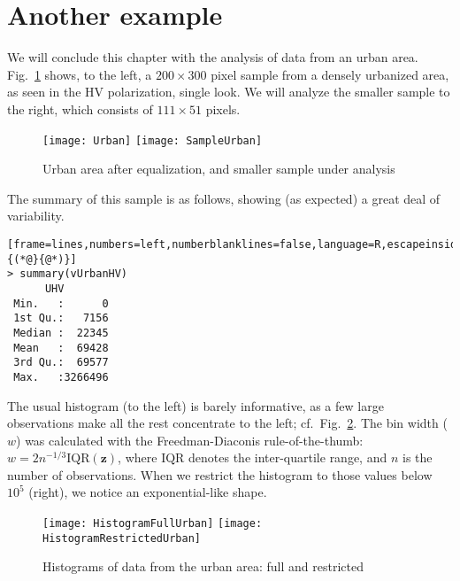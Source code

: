 \section{Another example}

We will conclude this chapter with the analysis of data from an urban area.
Fig.~\ref{Image:UrbanArea} shows, to the left, a $200\times 300$ pixel sample from a densely urbanized area, as seen in the HV polarization, single look.
We will analyze the smaller sample to the right, which consists of $111\times 51$ pixels.

\begin{figure}[hbt]
\centering
\texttt{[image: Urban]}\quad
\texttt{[image: SampleUrban]}
\caption{Urban area after equalization, and smaller sample under analysis}\label{Image:UrbanArea}
\end{figure}

The summary of this sample is as follows, showing (as expected) a great deal of variability.
\begin{lstlisting}[frame=lines,numbers=left,numberblanklines=false,language=R,escapeinside={(*@}{@*)}]
> summary(vUrbanHV)
      UHV         
 Min.   :      0  
 1st Qu.:   7156  
 Median :  22345  
 Mean   :  69428  
 3rd Qu.:  69577  
 Max.   :3266496  
\end{lstlisting}

The usual histogram (to the left) is barely informative, as a few large observations make all the rest concentrate to the left; cf.\ Fig.~\ref{Fig:HistogramsUrbanAreas}.
The bin width ($w$) was calculated with the Freedman-Diaconis rule-of-the-thumb: $w=2n^{-1/3}\text{IQR}(\bm z)$, where $\text{IQR}$ denotes the inter-quartile range, and $n$ is the number of observations\cite{OntheHistogramAsaDensityEstimatorL2Theory1981}.
When we restrict the histogram to those values below $10^5$ (right), we notice an exponential-like shape.

\begin{figure}[hbt]
\centering
\texttt{[image: HistogramFullUrban]}
\texttt{[image: HistogramRestrictedUrban]}
\caption{Histograms of data from the urban area: full and restricted}\label{Fig:HistogramsUrbanAreas}
\end{figure}


